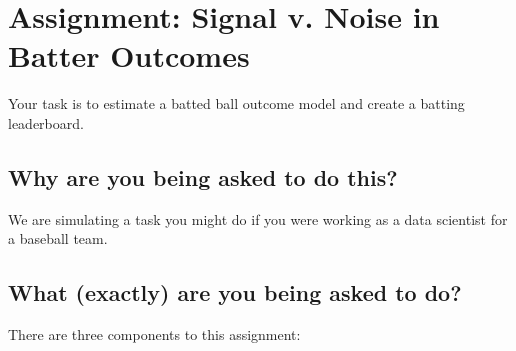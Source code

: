 \documentclass{article}
\begin{document}
  \section*{\sc Assignment: Signal v. Noise in Batter Outcomes}

    Your task is to estimate a batted ball outcome model and create a batting leaderboard.

    \subsection*{\sc Why are you being asked to do this?}

      We are simulating a task you might do if you were working as a data scientist for a baseball team.

    \subsection*{\sc What (exactly) are you being asked to do?}

      There are three components to this assignment:
\end{document}
